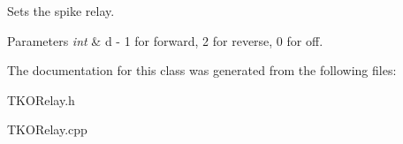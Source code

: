 \-Sets the spike relay. 


\begin{DoxyParams}{\-Parameters}
{\em int} & d -\/ 1 for forward, 2 for reverse, 0 for off. \\
\hline
\end{DoxyParams}


\-The documentation for this class was generated from the following files\-:\begin{DoxyCompactItemize}
\item 
\-T\-K\-O\-Relay.\-h\item 
\-T\-K\-O\-Relay.\-cpp\end{DoxyCompactItemize}
